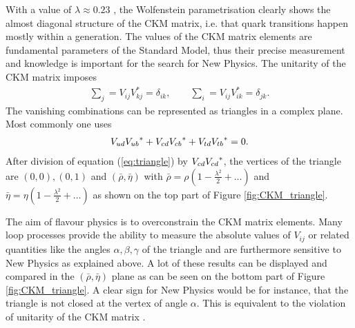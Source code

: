 With a value of $\lambda \approx 0.23$ \cite{PDG}, the Wolfenstein parametrisation clearly shows the almost diagonal structure of the CKM matrix, i.e. that quark transitions happen mostly within a generation.
The values of the CKM matrix elements are fundamental parameters of the Standard Model, thus their precise measurement and knowledge is important for the search for New Physics.
The unitarity of the CKM matrix imposes
\begin{align}
    \sum_j = V_{ij}V_{kj}^{\ast} = \delta_{ik}, \qquad \sum_i = V_{ij}V_{ik}^{\ast} = \delta_{jk}.
\end{align}
The vanishing combinations can be represented as triangles in a complex plane.
Most commonly one uses
\begin{align}
    {\ensuremath{V_{{u}{d}}}}{\ensuremath{V_{{u}{b}}}}^{\ast} + {V_{{c}{d}}}{V_{{c}{b}}}^{*} + {V_{{t}{d}}}{V_{{t}{b}}}^{\ast} = 0. \label{eq:triangle}
\end{align}
After division of equation (\ref{eq:triangle}) by ${V_{{c}{d}}}{V_{{c}{d}}}^{\ast}$, the vertices of the triangle are $(0,0), (0,1)$ and $(\bar{\rho}, \bar{\eta})$ with $\bar{\rho} = \rho (1 - \frac{\lambda^2}{2} + \ldots)$ and $\bar{\eta} = \eta (1 - \frac{\lambda^2}{2} + \ldots)$ as shown on the top part of Figure \ref{fig:CKM_triangle}.

The aim of flavour physics is to overconstrain the CKM matrix elements.
Many loop processes provide the ability to measure the absolute values of $V_{ij}$ or related quantities like the angles $\alpha, \beta, \gamma$ of the triangle and are furthermore sensitive to New Physics as explained above.
A lot of these results can be displayed and compared in the $(\bar{\rho}, \bar{\eta})$ plane as can be seen on the bottom part of Figure \ref{fig:CKM_triangle}.
A clear sign for New Physics would be for instance, that the triangle is not closed at the vertex of angle $\alpha$.
This is equivalent to the violation of unitarity of the CKM matrix \cite{PDG, Nierste}.

